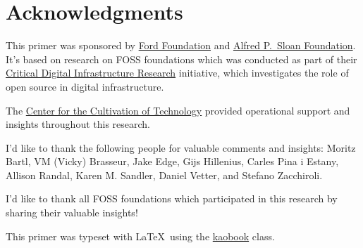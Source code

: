 


\chapter{Acknowledgments}

This primer was sponsored by \href{https://www.fordfoundation.org/}{Ford Foundation} and \href{https://sloan.org/}{Alfred P.\ Sloan Foundation}.  It's based on research on FOSS foundations which was conducted as part of their \href{https://www.fordfoundation.org/campaigns/critical-digital-infrastructure-research/}{Critical Digital Infrastructure Research} initiative, which investigates the role of open source in digital infrastructure.

The \href{https://techcultivation.org/}{Center for the Cultivation of Technology} provided operational support and insights throughout this research.

I'd like to thank the following people for valuable comments and insights: Moritz Bartl, VM (Vicky) Brasseur, Jake Edge, Gijs Hillenius, Carles Pina i Estany, Allison Randal, Karen M. Sandler, Daniel Vetter, and Stefano Zacchiroli.

I'd like to thank all FOSS foundations which participated in this research by sharing their valuable insights!

This primer was typeset with \LaTeX\ using the \href{https://github.com/fmarotta/kaobook}{kaobook} class.

